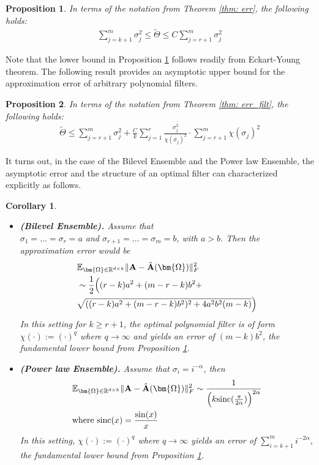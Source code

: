 \documentclass[conference]{IEEEtran}
\newcommand{\bOmega}{\bm{\Omega}}
\newcommand{\tTheta}{\tilde{\Theta}}
\newcommand{\bA}{\mathbf{A}}
\newcommand{\bbE}{\mathbb{E}}
\newcommand{\bbR}{\mathbb{R}}
\newcommand{\sinc}{\text{sinc}}
\newtheorem{corollary}{Corollary}
\newtheorem{proposition}{Proposition}
\begin{document}
\begin{proposition}\label{prop: upp_bnd}
In terms of the notation from Theorem \ref{thm: err}, the following holds:
\begin{align*}
   \sum_{j = k + 1}^m \sigma_j^2 \le  \tTheta \le C \sum_{j = r + 1}^m \sigma_j^2
\end{align*}
\end{proposition}
Note that the lower bound in Proposition \ref{prop: upp_bnd} follows readily from Eckart-Young theorem. The following result provides an asymptotic upper bound for the approximation error of arbitrary polynomial filters.
\begin{proposition}\label{prop: upp_bnd_filt}
    In terms of the notation from Theorem \ref{thm: err_filt}, the following holds:
    \begin{align*}
        \tTheta \le 
 \sum_{j = r + 1}^m  \sigma_j^2 + \frac{C}{k}\sum_{j=1}^r \frac{\sigma_j^2}{\chi(\sigma_j)^2} \cdot \sum_{j = r + 1}^m\chi(\sigma_j)^2 
    \end{align*}
\end{proposition}
It turns out, in the case of the Bilevel Ensemble and the Power law Ensemble, the asymptotic error and the structure of an optimal filter can characterized explicitly as follows.
\begin{corollary}\label{cor: ensemble}
\begin{itemize}
    \item {\bf(Bilevel Ensemble).} Assume that \\$\sigma_1 = \dots = \sigma_r = a$ and $\sigma_{r+1} = \dots = \sigma_{m} = b$, with $a > b$. Then the approximation error would be
    \begin{align}\label{eq: cor_bilevel}
        &\bbE_{\bOmega \in \bbR^{d \times k}}  \|\bA - \hat{\bA}(\bOmega)\|_F^2   \\& \sim \frac{1}{2} \Bigl((r-k) a^2 + (m - r- k) b^2 + \nonumber \\ & \sqrt{((r-k) a^2 + (m - r- k) b^2)^2 + 4 a^2 b ^2 (m-k)} \Bigr) \nonumber
    \end{align}
    In this setting for $k \ge r +1$, the optimal polynomial filter is of form $\chi(\cdot):=(\cdot)^q$ where $q \rightarrow \infty$ and yields an error of $(m-k) b^2$, the fundamental lower bound from Proposition \ref{prop: upp_bnd}.
    \item {\bf(Power law Ensemble).} Assume that $\sigma_i = i^{-\alpha}$, then 
    \begin{align}\label{eq: cor_power_law}
        & \bbE_{\bOmega \in \bbR^{d \times k}}  \|\bA - \hat{\bA}(\bOmega)\|_F^2  \sim \frac{1}{\Bigl(k \sinc(\frac{\pi}{2\alpha} )\Bigr)^{2\alpha}} \\
        &\text{where }\sinc(x) = \frac{\sin(x)}{x} \nonumber
    \end{align}
    In this setting, $\chi(\cdot):=(\cdot)^q$ where $q \rightarrow \infty$ yields an error of $\sum_{i=k+1}^m i^{-2\alpha}$, the fundamental lower bound from Proposition \ref{prop: upp_bnd}.
\end{itemize}
\end{corollary}
\end{document}
